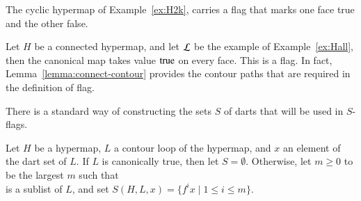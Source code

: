 \begin{example} 
The cyclic hypermap of Example~\ref{ex:H2k}, carries a
flag that marks one face true and the other false.
\end{example}

\begin{example}\label{ex:Hall-flag} 
Let $H$ be a connected hypermap, and let $\cal L$ be the example of
Example~\ref{ex:Hall}, then the canonical map takes value
${\operatorname{true}}$ on every face.  This is a flag. In fact,
Lemma~\ref{lemma:connect-contour} provides the contour paths that
are required in the definition of flag.
\end{example}




%
%


There is a standard way of constructing the sets $S$ of darts that
will be used in $S$-flags.  


\begin{definition}[S]
Let $H$ be a hypermap, $L$ a contour loop of the hypermap,
and $x$ an element of the dart set of $L$.
If  $L$ is  canonically true, then let $S=\emptyset$.
Otherwise,
let $m\ge0$ to be the largest $m$ 
such that 
\begin{displaymath}
[x;f x; f^2 x;\ldots;f^{m+1} x]
\end{displaymath}  
is a sublist of $L$, and
set $S(H,L,x) = \{f^i x \mid 1 \le i\le m\}$.
\end{definition}

